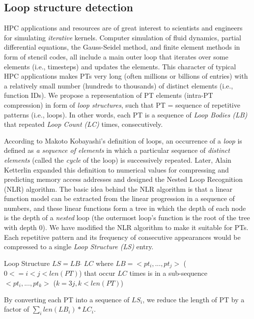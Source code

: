 \subsection{Loop structure detection}
\label{subsec:nlr}

HPC applications and resources are of great interest to scientists and engineers for simulating \textit{iterative} kernels. Computer simulation of fluid dynamics, partial differential equations, the Gauss-Seidel method, and finite element methods in form of stencil codes, all include a main outer loop that iterates over some elements (i.e., timesteps) and updates the elements.
%
This character of typical HPC applications makes PTs very long (often millions or billions of entries) with a relatively small number (hundreds to thousands) of distinct elements (i.e., function IDs).
%
We propose a representation of PT elements (intra-PT compression) in form of \textit{loop structures}, such that PT = sequence of repetitive patterns (i.e., loops). In other words, each PT is a sequence of \textit{Loop Bodies (LB)} that repeated \textit{Loop Count (LC)} times, consecutively.
%

According to Makoto Kobayashi's \cite{kobayashi-84} definition of loops, an occurrence of a \textit{loop} is defined as \textit{a sequence of elements} in which a particular sequence of \textit{distinct elements} (called the \textit{cycle} of the loop) is successively repeated.
%
Later, Alain Ketterlin \cite{Ketterlin-nlr} expanded this definition to numerical values for compressing and predicting memory access addresses and designed the Nested Loop Recognition (NLR) algorithm.
%
The basic idea behind the NLR algorithm is that a linear function model can be extracted from the linear progression in a sequence of numbers, and these linear functions form a tree in which the depth of each node is the depth of a \textit{nested} loop (the outermost loop's function is the root of the tree with depth 0).
%
We have modified the NLR algorithm to make it suitable for PTs.
%
Each repetitive pattern and its frequency of consecutive appearances would be compressed to a single \textit{Loop Structure (LS)} entry.
%
\begin{definition}{Loop Structure} $LS = LB \; \hat{} \; LC$ where $LB  = <pt_i,...,pt_j>$ ($0 <= i < j < len(PT)$) that occur $LC$ times is in a sub-sequence $<pt_i,...,pt_k>$ ($k = 3j, k < len(PT)$)

\end{definition}
%
By converting each PT into a sequence of $LS_i$, we reduce the length of PT by a factor of $\sum_i len(LB_i) * LC_i$. 
%

